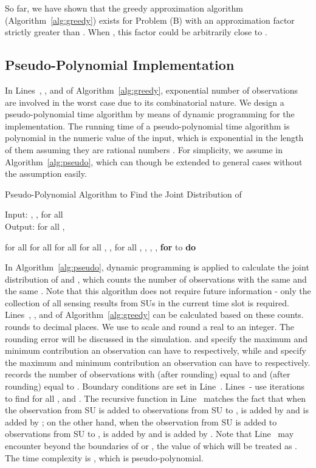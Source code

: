 \documentclass[conference]{IEEEtran}
\begin{document}
So far, we have shown that the greedy approximation algorithm (Algorithm~\ref{alg:greedy}) exists for Problem (B) with an approximation factor strictly greater than . When , this factor could be arbitrarily close to .

\subsection{Pseudo-Polynomial Implementation}
\label{subsec:comp}
In Lines~, ,  and  of Algorithm~\ref{alg:greedy}, exponential number of observations are involved in the worst case due to its combinatorial nature. We design a pseudo-polynomial time algorithm by means of dynamic programming for the implementation. The running time of a pseudo-polynomial time algorithm is polynomial in the numeric value of the input, which is exponential in the length of them assuming they are rational numbers \cite{Vijay}. For simplicity, we assume  in Algorithm~\ref{alg:pseudo}, which can though be extended to general cases without the assumption easily.

\begin{algorithm}[t]
    \caption{{\footnotesize Pseudo-Polynomial Algorithm to Find the Joint Distribution of }}\label{alg:pseudo}
    {\scriptsize Input: , ,  for all  \\Output:  for all , }
    \begin{algorithmic}[1]
    {\footnotesize \STATE  for all 
	\STATE  for all 
	\STATE  for all 
	\STATE  for all 
	\STATE , 
	\STATE , 
	\STATE  for all , , , , 
\STATE \textbf{for}  to  \textbf{do} 
			
		\ENDFOR
	\ENDFOR}
    \end{algorithmic}
\end{algorithm}

In Algorithm~\ref{alg:pseudo}, dynamic programming is applied to calculate the joint distribution of  and , which counts the number of observations with the same  and the same . Note that this algorithm does not require future information - only the collection of all sensing results from SUs in the current time slot is required. Lines~, ,  and  of Algorithm~\ref{alg:greedy} can be calculated based on these counts.  rounds  to  decimal places. We use  to scale and round a real  to an integer. The rounding error will be discussed in the simulation.  and  specify the maximum and minimum contribution an observation  can have to  respectively, while  and  specify the maximum and minimum contribution an observation  can have to  respectively.  records the number of observations with  (after rounding) equal to  and  (after rounding) equal to . Boundary conditions are set in Line~. Lines~- use iterations to find  for all ,  and . The recursive function in Line~ matches the fact that when the  observation from SU  is added to observations from SU  to ,  is added by  and  is added by ; on the other hand, when the  observation from SU  is added to observations from SU  to ,  is added by  and  is added by . Note that Line~ may encounter  beyond the boundaries of  or , the value of which will be treated as . The time complexity is , which is pseudo-polynomial.
\end{document}
